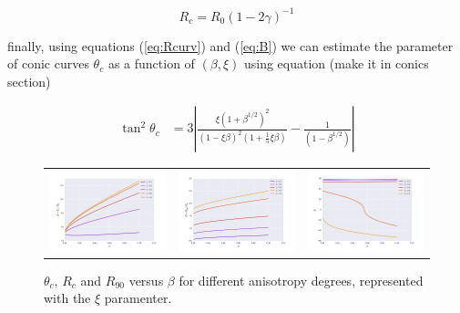 \begin{equation}
R_c = R_0\left(1-2\gamma\right)^{-1}
\label{eq:Rcurv}
\end{equation}

finally, using equations (\ref{eq:Rcurv}) and (\ref{eq:B}) we can estimate the parameter of conic curves $\theta_c$ as a function of $(\beta,\xi)$ using equation (make it in conics section)

\begin{align}
\tan^2\theta_c &= 3\left| \frac{\xi\left(1+\beta^{1/2}\right)^2}{\left(1-\xi\beta\right)^2\left(1+\frac{1}{5}\xi\beta\right)}-\frac{1}{\left(1-\beta^{1/2}\right)}\right| 
\end{align}

\begin{figure}
\begin{tabular}{ccc}
\includegraphics[width=0.35\linewidth]{A-beta}&
\includegraphics[width=0.35\linewidth]{B-beta} &
\includegraphics[width=0.35\linewidth]{thc-beta}
\end{tabular}
\caption{$\theta_c$, $R_c$ and $R_{90}$ versus $\beta$ for different anisotropy degrees, represented with the $\xi$ paramenter.}
\label{fig:rad-beta}
\end{figure}



